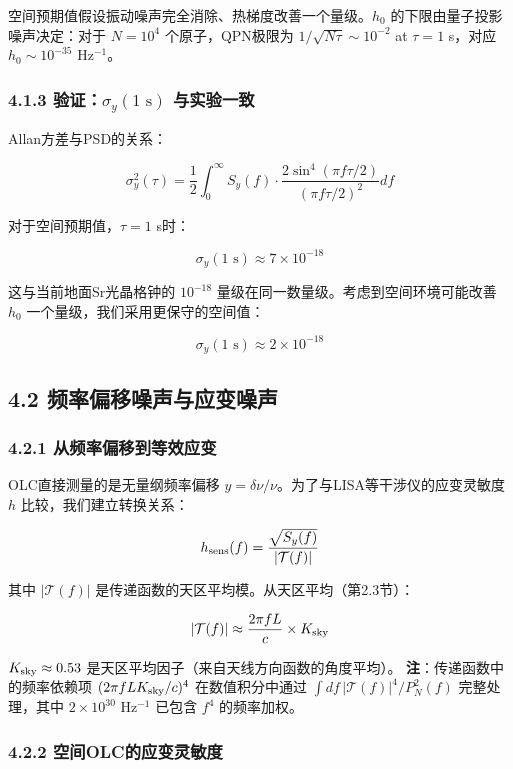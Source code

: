 \documentclass[12pt,a4paper]{article}
\begin{document}
空间预期值假设振动噪声完全消除、热梯度改善一个量级。$h_0$ 的下限由量子投影噪声决定：对于 $N = 10^4$ 个原子，QPN极限为 $1/\sqrt{N\tau} \sim 10^{-2}$ at $\tau = 1$ s，对应 $h_0 \sim 10^{-35}$ Hz$^{-1}$。

\subsubsection{4.1.3 验证：$\sigma_y(1\text{ s})$ 与实验一致}


Allan方差与PSD的关系：

$$\sigma_y^2(\tau) = \frac{1}{2} \int_0^\infty S_y(f) \cdot \frac{2\sin^4(\pi f \tau/2)}{(\pi f \tau/2)^2} df$$

对于空间预期值，$\tau = 1$ s时：

$$\sigma_y(1\text{ s}) \approx 7 \times 10^{-18}$$

这与当前地面Sr光晶格钟的 $10^{-18}$ 量级在同一数量级。考虑到空间环境可能改善 $h_0$ 一个量级，我们采用更保守的空间值：

$$\sigma_y(1\text{ s}) \approx 2 \times 10^{-18}$$

\subsection{4.2 频率偏移噪声与应变噪声}


\subsubsection{4.2.1 从频率偏移到等效应变}


OLC直接测量的是无量纲频率偏移 $y = \delta\nu/\nu$。为了与LISA等干涉仪的应变灵敏度 $h$ 比较，我们建立转换关系：

$$h_{\rm sens}(f) = \frac{\sqrt{S_y(f)}}{|\mathcal{T}(f)|}$$

其中 $|\mathcal{T}(f)|$ 是传递函数的天区平均模。从天区平均（第2.3节）：

$$|\mathcal{T}(f)| \approx \frac{2\pi f L}{c} \times K_{\rm sky}$$

$K_{\rm sky} \approx 0.53$ 是天区平均因子（来自天线方向函数的角度平均）。
\textbf{注}：传递函数中的频率依赖项 $(2\pi f L K_{\rm sky}/c)^4$ 在数值积分中通过 $\int df\,|\mathcal{T}(f)|^4/P_N^2(f)$ 完整处理，其中 $2\times 10^{30}$ Hz$^{-1}$ 已包含 $f^4$ 的频率加权。

\subsubsection{4.2.2 空间OLC的应变灵敏度}
\end{document}
